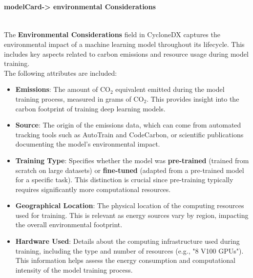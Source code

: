 \documentclass[12pt,a4paper, oneside, openright]{book}
\begin{document}
\newpage
\paragraph{modelCard-> environmental Considerations} \mbox{} \\
The \textbf{Environmental Considerations} field in CycloneDX captures the environmental impact of a machine learning model throughout its lifecycle. This includes key aspects related to carbon emissions and resource usage during model training. \\The following attributes are included:

\begin{itemize}
    \item \textbf{Emissions}: The amount of CO$_2$ equivalent emitted during the model training process, measured in grams of CO$_2$. This provides insight into the carbon footprint of training deep learning models.
    \item \textbf{Source}: The origin of the emissions data, which can come from automated tracking tools such as AutoTrain and CodeCarbon, or scientific publications documenting the model's environmental impact.
    \item \textbf{Training Type}: Specifies whether the model was \textbf{pre-trained} (trained from scratch on large datasets) or \textbf{fine-tuned} (adapted from a pre-trained model for a specific task). This distinction is crucial since pre-training typically requires significantly more computational resources.
    \item \textbf{Geographical Location}: The physical location of the computing resources used for training. This is relevant as energy sources vary by region, impacting the overall environmental footprint.
    \item \textbf{Hardware Used}: Details about the computing infrastructure used during training, including the type and number of resources (e.g., "8 V100 GPUs"). This information helps assess the energy consumption and computational intensity of the model training process.
\end{itemize}
\end{document}
